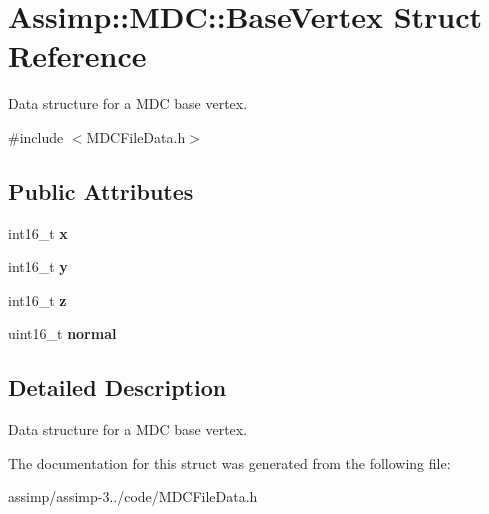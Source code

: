 \hypertarget{struct_assimp_1_1_m_d_c_1_1_base_vertex}{\section{Assimp\+:\+:M\+D\+C\+:\+:Base\+Vertex Struct Reference}
\label{struct_assimp_1_1_m_d_c_1_1_base_vertex}
}


Data structure for a M\+D\+C base vertex.  




{\ttfamily \#include $<$M\+D\+C\+File\+Data.\+h$>$}

\subsection*{Public Attributes}
\begin{DoxyCompactItemize}
\item 
\hypertarget{struct_assimp_1_1_m_d_c_1_1_base_vertex_a1b3fea2c95e39ec776cc00ff3214e602}{int16\+\_\+t {\bfseries x}}\label{struct_assimp_1_1_m_d_c_1_1_base_vertex_a1b3fea2c95e39ec776cc00ff3214e602}

\item 
\hypertarget{struct_assimp_1_1_m_d_c_1_1_base_vertex_a4139019c6da83c7ee3820265e6e87ee6}{int16\+\_\+t {\bfseries y}}\label{struct_assimp_1_1_m_d_c_1_1_base_vertex_a4139019c6da83c7ee3820265e6e87ee6}

\item 
\hypertarget{struct_assimp_1_1_m_d_c_1_1_base_vertex_a8e21466aa2a838dc38cb9497990cc303}{int16\+\_\+t {\bfseries z}}\label{struct_assimp_1_1_m_d_c_1_1_base_vertex_a8e21466aa2a838dc38cb9497990cc303}

\item 
\hypertarget{struct_assimp_1_1_m_d_c_1_1_base_vertex_ac92d69026384e310afe6a3a47992d67d}{uint16\+\_\+t {\bfseries normal}}\label{struct_assimp_1_1_m_d_c_1_1_base_vertex_ac92d69026384e310afe6a3a47992d67d}

\end{DoxyCompactItemize}


\subsection{Detailed Description}
Data structure for a M\+D\+C base vertex. 

The documentation for this struct was generated from the following file\+:\begin{DoxyCompactItemize}
\item 
assimp/assimp-\/3../code/M\+D\+C\+File\+Data.\+h\end{DoxyCompactItemize}
